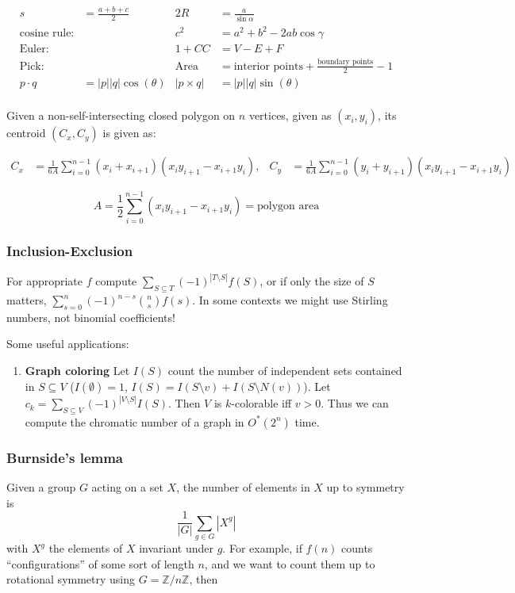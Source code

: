 \documentclass[
	a4paper,
	landscape,
	10pt,
]{article}
\begin{document}
\begin{multicols}{3}
		\begin{align*}
			s &= \frac {a+b+c}2 & 2R &=\frac{a}{\sin \alpha}\\
			\textrm{cosine rule:}&&  c^2 &= a^2 + b^2 - 2ab\cos \gamma\\
			\textrm{Euler:}&&  1 + CC &= V - E + F\\
			\textrm{Pick:}&& \textrm{Area} &= \textrm{interior points}
			+ \frac{\textrm{boundary points}}2 - 1\\
			p\cdot q &= |p||q|\cos(\theta) & |p\times q| &= |p||q|\sin(\theta)\\
		\end{align*}

		Given a non-self-intersecting closed polygon on $n$ vertices, given as $(x_i, y_i)$, its centroid $(C_x, C_y)$ is given as:

		\begin{align*}
			C_x &= \frac{1}{6A} \sum_{i = 0}^{n - 1} (x_i + x_{i+1}) (x_i y_{i+1} - x_{i+1} y_i), &
			C_y &= \frac{1}{6A} \sum_{i = 0}^{n - 1} (y_i + y_{i+1}) (x_i y_{i+1} - x_{i+1} y_i)
		\end{align*}

		\begin{equation*}
			A = \frac{1}{2} \sum_{i = 0}^{n - 1} (x_i y_{i+1} - x_{i+1} y_i) = \textrm{polygon area}
		\end{equation*}

		\subsubsection*{Inclusion-Exclusion}
		For appropriate $f$ compute $\sum_{S\subseteq T} (-1)^{|T\setminus S|} f(S)$,
		or if only the size of $S$ matters, $\sum_{s=0}^n (-1)^{n-s} \binom{n}{s}f(s)$.
		In some contexts we might use Stirling numbers, not binomial coefficients!

		Some useful applications:
		\begin{enumerate}
			\item[] \textbf{Graph coloring} Let $I(S)$ count the number
				of independent sets
				contained in $S \subseteq V$ ($I(\emptyset) = 1$,
				$I(S) = I(S\setminus v) + I(S\setminus N(v))$). Let
				$c_k = \sum_{S\subseteq V} (-1)^{|V\setminus S|} I(S)$. Then $V$
				is $k$-colorable iff $v > 0$. Thus we can compute the chromatic
				number of a graph in $O^*(2^n)$ time.
		\end{enumerate}

		\subsubsection*{Burnside's lemma}
		Given a group $G$ acting on a set $X$, the number of elements in $X$ up to
		symmetry is $$\frac{1}{|G|}\sum_{g\in G} |X^g|$$ with $X^g$ the elements of
		$X$ invariant under $g$. For example, if $f(n)$ counts ``configurations''
		of some sort of length $n$, and we want to count them up to rotational symmetry
		using $G = \mathbb{Z}/n\mathbb{Z}$, then


\end{multicols}
\end{document}
